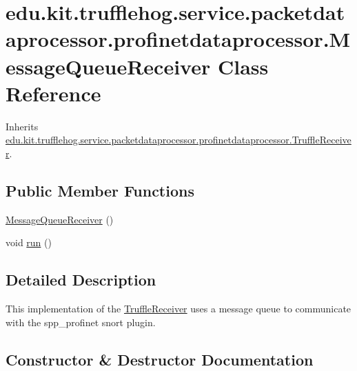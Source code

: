 \hypertarget{classedu_1_1kit_1_1trufflehog_1_1service_1_1packetdataprocessor_1_1profinetdataprocessor_1_1_message_queue_receiver}{}\section{edu.\+kit.\+trufflehog.\+service.\+packetdataprocessor.\+profinetdataprocessor.\+Message\+Queue\+Receiver Class Reference}
\label{classedu_1_1kit_1_1trufflehog_1_1service_1_1packetdataprocessor_1_1profinetdataprocessor_1_1_message_queue_receiver}


Inherits \hyperlink{classedu_1_1kit_1_1trufflehog_1_1service_1_1packetdataprocessor_1_1profinetdataprocessor_1_1_truffle_receiver}{edu.\+kit.\+trufflehog.\+service.\+packetdataprocessor.\+profinetdataprocessor.\+Truffle\+Receiver}.

\subsection*{Public Member Functions}
\begin{DoxyCompactItemize}
\item 
\hyperlink{classedu_1_1kit_1_1trufflehog_1_1service_1_1packetdataprocessor_1_1profinetdataprocessor_1_1_message_queue_receiver_a31dad1654052ad70cf48b81dbc027a00}{Message\+Queue\+Receiver} ()
\item 
void \hyperlink{classedu_1_1kit_1_1trufflehog_1_1service_1_1packetdataprocessor_1_1profinetdataprocessor_1_1_message_queue_receiver_a8880f03a0cbc1fd2ef6e6fa1dfac91e9}{run} ()
\end{DoxyCompactItemize}


\subsection{Detailed Description}
This implementation of the \hyperlink{classedu_1_1kit_1_1trufflehog_1_1service_1_1packetdataprocessor_1_1profinetdataprocessor_1_1_truffle_receiver}{Truffle\+Receiver} uses a message queue to communicate with the spp\+\_\+profinet snort plugin. 

\subsection{Constructor \& Destructor Documentation}
\hypertarget{classedu_1_1kit_1_1trufflehog_1_1service_1_1packetdataprocessor_1_1profinetdataprocessor_1_1_message_queue_receiver_a31dad1654052ad70cf48b81dbc027a00}{}
